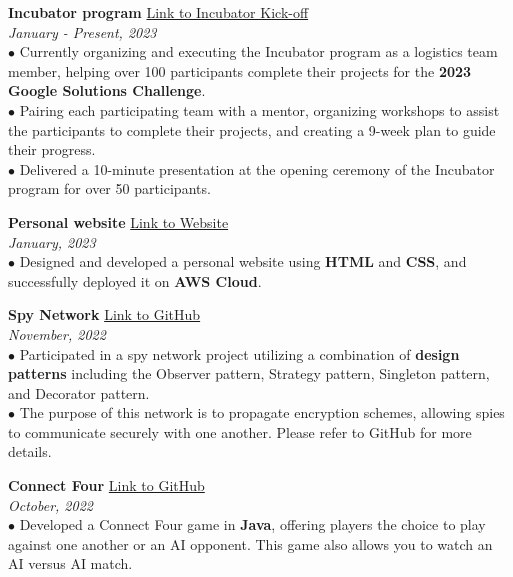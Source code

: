 \documentclass[letterpaper,12pt]{article}
\begin{document}
\textbf{Incubator program} \hfill \href{https://youtu.be/gJmWtfJp0Yc?t=345}{Link to Incubator Kick-off}\\
\textit{January - Present, 2023}\\
\hspace{0.1cm} $\bullet$ \hspace{0.04cm}Currently organizing and executing the Incubator program as a logistics team member, helping over 100 participants complete their projects for the \textbf{2023 Google Solutions Challenge}. \\
\hspace{0.1cm} $\bullet$ \hspace{0.1cm}Pairing each participating team with a mentor, organizing workshops to assist the participants to complete their projects, and creating a 9-week plan to guide their progress. \\ 
\hspace{0.1cm} $\bullet$ \hspace{0.1cm}Delivered a 10-minute presentation at the opening ceremony of the Incubator program for over 50 participants. 

\textbf{Personal website} \hfill \href{https://www.zicheng-li.com/}{Link to Website} \\
\textit{January, 2023} \\ 
\hspace{0.1cm} $\bullet$\hspace{0.1cm} Designed and developed a personal website using \textbf{HTML} and \textbf{CSS}, and successfully deployed it on \textbf{AWS Cloud}.

\textbf{Spy Network} \hfill \href{https://github.com/Zicheng-Li/Spy_Network_Framework}{Link to GitHub} \\
\textit{November, 2022} \\
\hspace{0.1cm} $\bullet$ Participated in a spy network project utilizing a combination of \textbf{design patterns} including the Observer pattern, Strategy pattern, Singleton pattern, and Decorator pattern.\\
\hspace{0.1cm} $\bullet$ The purpose of this network is to propagate encryption schemes, allowing spies to communicate securely with one another. Please refer to GitHub for more details.

\textbf{Connect Four}  \hfill \href{https://github.com/Zicheng-Li/Connect_Four}{Link to GitHub} \\
\textit{October, 2022} \\ 
\hspace{0.1cm} $\bullet$ Developed a Connect Four game in \textbf{Java}, offering players the choice to play against one another or an AI opponent. This game also allows you to watch an AI versus AI match.
\end{document}

